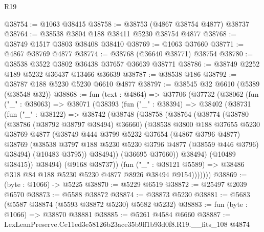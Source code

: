 \begin{lexlean}{R19}
\begin{coremodule}
@38754 := @1063 @38415
@38758 := @38753 (@4867 @38754 @4877) @38737
@38764 := @38538 @3804 @188 @38411 @5230 @38754 @4877
@38768 := @38749 @1517 @3803 @38408 @38410
@38769 := @1063 @37660
@38771 := @4867 @38769 @4877
@38774 := @38768 (@36640 @38771) @38754
@38780 := @38538 @3522 @3802 @36438 @37657 @36639 @38771
@38786 := @38749 @2252 @189 @5232 @36437 @13466 @36639
@38787 := @38538 @186
@38792 := @38787 @188 @5230 @5230 @6610 @4877
@38797 := @38545 @32 @6610 (@5389 (@38548 @32))
@38868 := fun (text : @4864) =>
  @37706
    (@37732
      (@38062
        (fun ("_" : @38063) =>
        @38071
          (@38393
            (fun ("_" : @38394) =>
            @38402
              (@38731
                (fun ("_" : @38122) =>
                @38742
                  (@38748
                    (@38758
                      (@38764
                        (@38774
                          (@38780
                            (@38786 (@38792 @38797 @38494) @36660)
                            (@38538
                              @3800
                              @188
                              @37655
                              @5230
                              @38769
                              @4877
                              (@38749
                                @444
                                @3799
                                @5232
                                @37654
                                (@4867 @3796 @4877)
                                @38769
                                (@38538
                                  @3797
                                  @188
                                  @5230
                                  @5230
                                  @3796
                                  @4877
                                  (@38559 @446 @3796)
                                  @38494)
                                (@10483 @3795))
                              @38494))
                          (@36695 @37660))
                        @38494)
                      (@10489 @38415))
                    @38494)
                  (@9168 @38737))
                (fun ("_" : @38121 @5589) =>
                @38486 @318 @84 @188 @5230 @5230 @4877 @8926 @38494 @9154)))))))
@38869 := (byte : @1066) -> @5225
@38870 := @5229 @6519
@38872 := @25497 @2039 @6570
@38873 := @5588 @38872
@38874 := @38873 @5230
@38881 := @5683 (@5587 @38874 (@5593 @38872 @5230) @5682 @5232)
@38883 := fun (byte : @1066) => @38870 @38881
@38885 := @5261 @4584 @6660
@38887 := LexLeanPreserve.Ce11ed3e58126b23ace35b9ff1b93d0f8.R19.__fits_108 @4874

\end{coremodule}
\end{lexlean}
